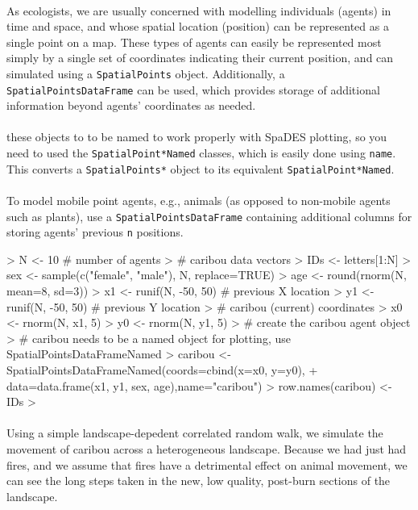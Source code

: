 \documentclass{article}
\begin{document}
\paragraph{}
As ecologists, we are usually concerned with modelling individuals (agents) in time and space, and whose spatial location (position) can be represented as a single point on a map. These types of agents can easily be represented most simply by a single set of coordinates indicating their current position, and can simulated using a \texttt{SpatialPoints} object. Additionally, a \texttt{SpatialPointsDataFrame} can be used, which provides storage of additional information beyond agents' coordinates as needed.

\paragraph{}
these objects to to be named to work properly with SpaDES plotting, so you need to used the \texttt{SpatialPoint*Named} classes, which is easily done using \texttt{name}. This converts a \texttt{SpatialPoints*} object to its equivalent \texttt{SpatialPoint*Named}.

\paragraph{}
To model mobile point agents, e.g., animals (as opposed to non-mobile agents such as plants), use a \texttt{SpatialPointsDataFrame} containing additional columns for storing agents' previous \texttt{n} positions.

\begin{Schunk}
\begin{Sinput}
> N <- 10 # number of agents
> # caribou data vectors
> IDs <- letters[1:N]
> sex <- sample(c("female", "male"), N, replace=TRUE)
> age <- round(rnorm(N, mean=8, sd=3))
> x1 <- runif(N, -50, 50) # previous X location
> y1 <- runif(N, -50, 50) # previous Y location
> # caribou (current) coordinates
> x0 <- rnorm(N, x1, 5)
> y0 <- rnorm(N, y1, 5)
> # create the caribou agent object
> # caribou needs to be a named object for plotting, use SpatialPointsDataFrameNamed
> caribou <- SpatialPointsDataFrameNamed(coords=cbind(x=x0, y=y0),
+                                   data=data.frame(x1, y1, sex, age),name="caribou")
> row.names(caribou) <- IDs
> 
\end{Sinput}
\end{Schunk}

\paragraph{}
Using a simple landscape-depedent correlated random walk, we simulate the movement of caribou across a heterogeneous landscape. Because we had just had fires, and we assume that fires have a detrimental effect on animal movement, we can see the long steps taken in the new, low quality, post-burn sections of the landscape.
\end{document}
